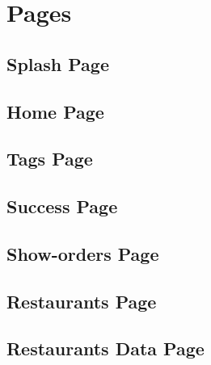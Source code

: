 \section{Pages}
\subsection{Splash Page}

\subsection{Home Page}

\subsection{Tags Page}

\subsection{Success Page}

\subsection{Show-orders Page}

\subsection{Restaurants Page}

\subsection{Restaurants Data Page}

